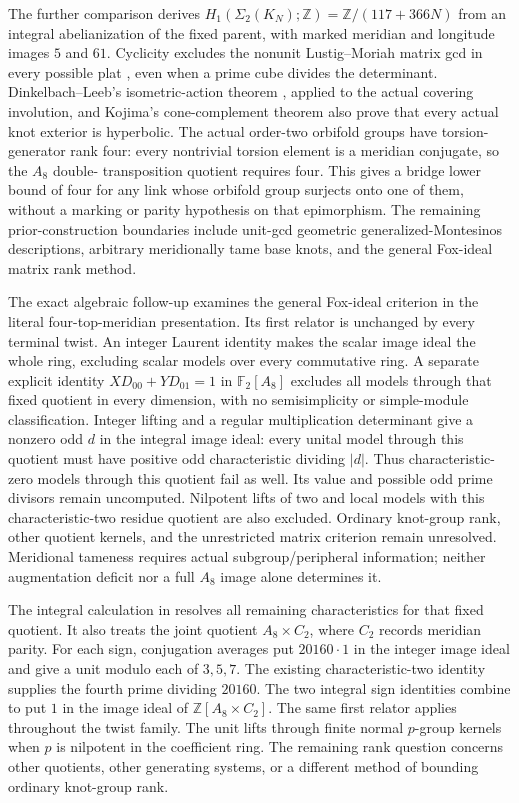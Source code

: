 \documentclass[11pt]{article}
\begin{document}
The further comparison 
derives $H_1(\Sigma_2(K_N);\mathbb Z)=\mathbb Z/(117+366N)$
from an integral abelianization of the fixed parent, with marked
meridian and longitude images $5$ and $61$. Cyclicity excludes the
nonunit Lustig--Moriah matrix gcd in every possible plat
\cite[Proposition5.6]{lustig93}, even when a prime cube divides the
determinant. Dinkelbach--Leeb's isometric-action theorem \cite{dl09},
applied to the actual covering involution, and Kojima's
cone-complement theorem \cite[Theorem1.2.1]{kojima98} also prove
that every actual knot exterior is hyperbolic. The actual order-two
orbifold groups have torsion-generator rank four: every nontrivial
torsion element is a meridian conjugate, so the $A_8$ double-
transposition quotient requires four. This gives a bridge lower bound
of four for any link whose orbifold group surjects onto one of them,
without a marking or parity hypothesis on that epimorphism.
The remaining prior-construction boundaries include unit-gcd
geometric generalized-Montesinos descriptions, arbitrary meridionally
tame base knots, and the general Fox-ideal matrix rank method.


The exact algebraic follow-up 
examines the general Fox-ideal criterion \cite[Theorem3.5,pp.197--198]{moriah}
in the literal four-top-meridian presentation. Its first relator is
unchanged by every terminal twist. An integer Laurent identity makes
the scalar image ideal the whole ring, excluding scalar models over
every commutative ring. A separate explicit identity
$X D_{00}+Y D_{01}=1$ in $\mathbb F_2[A_8]$ excludes all models through
that fixed quotient in every dimension, with no semisimplicity or
simple-module classification. Integer lifting and a regular
multiplication determinant give a nonzero odd $d$ in the integral
image ideal: every unital model through this quotient must have
positive odd characteristic dividing $|d|$. Thus characteristic-zero
models through this quotient fail as well. Its value and possible odd
prime divisors remain uncomputed. Nilpotent lifts of two and local
models with this characteristic-two residue quotient are also
excluded. Ordinary knot-group rank, other quotient kernels, and the
unrestricted matrix criterion remain unresolved. Meridional tameness
requires actual subgroup/peripheral information; neither augmentation
deficit nor a full $A_8$ image alone determines it.


The integral calculation in  resolves
all remaining characteristics for that fixed quotient. It also treats
the joint quotient $A_8\times C_2$, where $C_2$ records meridian parity.
For each sign, conjugation averages put $20160\cdot1$ in the integer
image ideal and give a unit modulo each of $3,5,7$. The existing
characteristic-two identity supplies the fourth prime dividing $20160$.
The two integral sign identities combine to put $1$ in the image ideal
of $\mathbb Z[A_8\times C_2]$. The same first relator applies throughout
the twist family. The unit lifts through finite normal $p$-group
kernels when $p$ is nilpotent in the coefficient ring. The remaining
rank question concerns other quotients, other generating systems, or
a different method of bounding ordinary knot-group rank.
\end{document}
